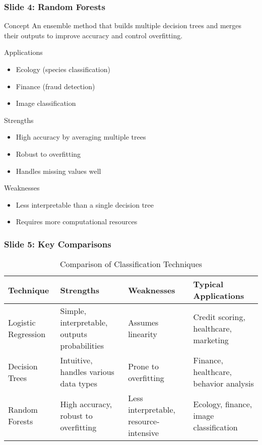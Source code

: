 \documentclass[aspectratio=169]{beamer}
\begin{document}
\begin{frame}[fragile]
    \frametitle{Slide 4: Random Forests}
    \begin{block}{Concept}
        An ensemble method that builds multiple decision trees and merges their outputs to improve accuracy and control overfitting.
    \end{block}
    \begin{block}{Applications}
        \begin{itemize}
            \item Ecology (species classification)
            \item Finance (fraud detection)
            \item Image classification
        \end{itemize}
    \end{block}
    \begin{block}{Strengths}
        \begin{itemize}
            \item High accuracy by averaging multiple trees
            \item Robust to overfitting
            \item Handles missing values well
        \end{itemize}
    \end{block}
    \begin{block}{Weaknesses}
        \begin{itemize}
            \item Less interpretable than a single decision tree
            \item Requires more computational resources
        \end{itemize}
    \end{block}
\end{frame}

\begin{frame}[fragile]
    \frametitle{Slide 5: Key Comparisons}
    \begin{table}[ht]
        \centering
        \begin{tabular}{|l|l|l|l|}
            \hline
            \textbf{Technique} & \textbf{Strengths} & \textbf{Weaknesses} & \textbf{Typical Applications} \\ \hline
            Logistic Regression & Simple, interpretable, outputs probabilities & Assumes linearity & Credit scoring, healthcare, marketing \\ \hline
            Decision Trees & Intuitive, handles various data types & Prone to overfitting & Finance, healthcare, behavior analysis \\ \hline
            Random Forests & High accuracy, robust to overfitting & Less interpretable, resource-intensive & Ecology, finance, image classification \\ \hline
        \end{tabular}
        \caption{Comparison of Classification Techniques}
    \end{table}
\end{frame}
\end{document}
